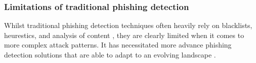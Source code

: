 
\subsubsection*{Limitations of traditional phishing detection}
Whilst traditional phishing detection techniques often heavily rely on blacklists, heurestics, and analysis of content \citep{sheng2009empirical}, they are clearly limited when it comes to more complex attack patterns. It has necessitated more advance phishing detection solutions that are able to adapt to an evolving landscape \citep{andriu2023adaptive}.
